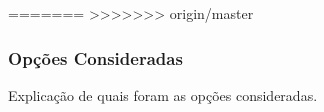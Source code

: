 \begin{table}[h!]

	
=======
>>>>>>> origin/master
	\subsubsection{Opções Consideradas}\label{fpga-options}
	
	Explicação de quais foram as opções consideradas.
	

\end{table}
